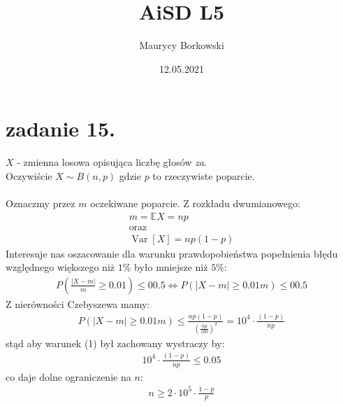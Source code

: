 \documentclass{article}
\title{AiSD L5}
\date{12.05.2021}
\author{Maurycy Borkowski}
\begin{document}
\section{zadanie 15.}
$X$ - zmienna losowa opisująca liczbę głosów \textit{za}. \\Oczywiście $X \sim B(n, p)$ gdzie $p$ to rzeczywiste poparcie.\\\\
Oznaczmy przez $m$ oczekiwane poparcie. Z rozkładu dwumianowego:
\begin{align*}
m = \mathbb EX = np\\
\text{oraz}\\
\operatorname{Var}[X] = np(1-p)
\end{align*}
Interesuje nas oszacowanie dla warunku prawdopobieństwa popełnienia błędu względnego większego niż $1\%$ było mniejsze niż $5\%$:
\begin{align}
P\left( \frac{|X-m|}{m} \geq 0.01 \right) \leq 00.5
\iff
P\left( |X-m| \geq 0.01m \right) \leq 00.5
\end{align}
Z nierówności Czebyszewa mamy:
\begin{align*}
P\left( |X-m| \geq 0.01m \right) \leq \frac{np(1-p)}{\left(\frac{np}{100} \right)^2} = 10^4 \cdot \frac{(1-p)}{np}
\end{align*}
stąd aby warunek (1) był zachowany wystraczy by:
\begin{align*}
10^4 \cdot \frac{(1-p)}{np} \leq 0.05
\end{align*}
co daje dolne ograniczenie na $n$:
\begin{align*}
n \geq 2\cdot10^5\cdot\frac{1-p}p
\end{align*}
\clearpage
\setcounter{equation}{0}
\end{document}
